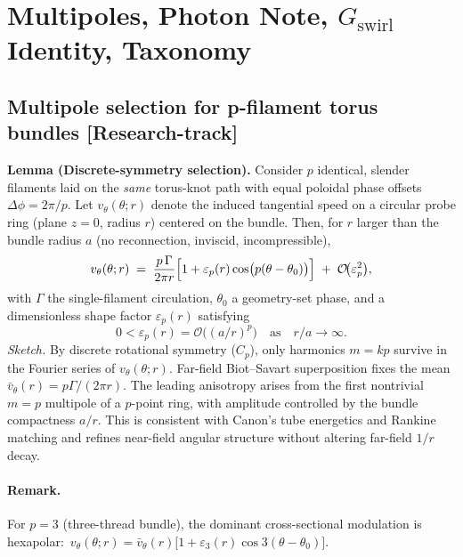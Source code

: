 \documentclass[10pt,reprint,aps,onecolumn,nofootinbib]{revtex4-2}
\newcommand{\statusResearch}{\textsf{[Research-track]}}
\begin{document}

    \section{Multipoles, Photon Note, \texorpdfstring{\(G_{\text{swirl}}\)}{G_swirl} Identity, Taxonomy}

    \subsection{Multipole selection for p-filament torus bundles \statusResearch}
        \textbf{Lemma (Discrete-symmetry selection).}
        Consider \(p\) identical, slender filaments laid on the \emph{same} torus-knot path with equal poloidal phase offsets \(\Delta\phi=2\pi/p\). Let \(v_\theta(\theta;r)\) denote the induced tangential speed on a circular probe ring (plane \(z=0\), radius \(r\)) centered on the bundle. Then, for \(r\) larger than the bundle radius \(a\) (no reconnection, inviscid, incompressible),
        \[
            v_\theta(\theta;r)\;=\;\frac{p\,\Gamma}{2\pi r}\Bigl[1+\varepsilon_p(r)\cos\!\big(p(\theta-\theta_0)\big)\Bigr]
            \;+\;\mathcal{O}\!\big(\varepsilon_p^2\big),
        \]
        with \(\Gamma\) the single-filament circulation, \(\theta_0\) a geometry-set phase, and a dimensionless shape factor \(\varepsilon_p(r)\) satisfying
        \[
            0<\varepsilon_p(r)=\mathcal{O}\!\big((a/r)^p\big)\quad\text{as}\quad r/a\to\infty.
        \]
        \emph{Sketch.} By discrete rotational symmetry (\(C_p\)), only harmonics \(m=kp\) survive in the Fourier series of \(v_\theta(\theta;r)\). Far-field Biot–Savart superposition fixes the mean \(\bar v_\theta(r)=p\Gamma/(2\pi r)\). The leading anisotropy arises from the first nontrivial \(m=p\) multipole of a \(p\)-point ring, with amplitude controlled by the bundle compactness \(a/r\). This is consistent with Canon’s tube energetics and Rankine matching and refines near-field angular structure without altering far-field \(1/r\) decay.

        \paragraph{Remark.}
            For \(p=3\) (three-thread bundle), the dominant cross-sectional modulation is hexapolar:
            \(\,v_\theta(\theta;r)=\bar v_\theta(r)\big[1+\varepsilon_3(r)\cos 3(\theta-\theta_0)\big]\).
\end{document}
